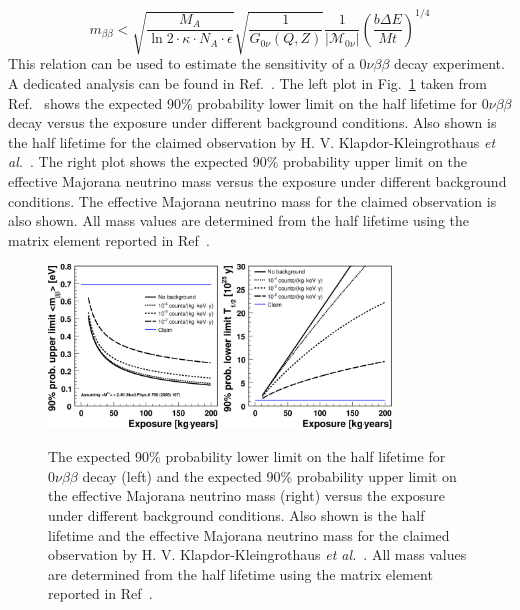 \begin{equation}
  \label{eq:gerda:mbb}
  m_{\beta\beta} < \sqrt{\frac{M_{A}}{\ln2 \cdot \kappa \cdot N_{A} \cdot \epsilon}} \sqrt{\frac{1}{G_{0\nu}(Q,Z)}} \frac{1}{|\mathcal{M}_{0\nu}|} (\frac{b \Delta E}{M t})^{1/4}
\end{equation}
This relation can be used to estimate the sensitivity of a $0\nu\beta\beta$ decay experiment. A dedicated analysis can be found in Ref.~\cite{Cal06}. The left plot in Fig.~\ref{fig:gerda:limit} taken from Ref.~\cite{Cal06} shows the expected 90\% probability lower limit on the half lifetime for $0\nu\beta\beta$ decay versus the exposure under different background conditions. Also shown is the half lifetime for the claimed observation by H. V. Klapdor-Kleingrothaus \textit{et al.}~\cite{Hei04}. The right plot shows the expected 90\% probability upper limit on the effective Majorana neutrino mass versus the exposure under different background conditions. The effective Majorana neutrino mass for the claimed observation is also shown. All mass values are determined from the half lifetime using the matrix element reported in Ref~\cite{Rod07}.
\begin{figure}[tbhp]
  \centering
  \includegraphics[width=0.4\textwidth]{limit_mass}  \hfil
  \includegraphics[width=0.4\textwidth]{limit_halflife}
  \caption{The expected 90\% probability lower limit on the half     lifetime for $0\nu\beta\beta$ decay (left) and the expected 90\%     probability upper limit on the effective Majorana neutrino mass     (right) versus the exposure under different background conditions.     Also shown is the half lifetime and the effective Majorana     neutrino mass for the claimed observation by H. V.     Klapdor-Kleingrothaus \textit{et al.}~\cite{Hei04}. All mass     values are determined from the half lifetime using the matrix     element reported in Ref~\cite{Rod07}.}
  \label{fig:gerda:limit}
\end{figure}

